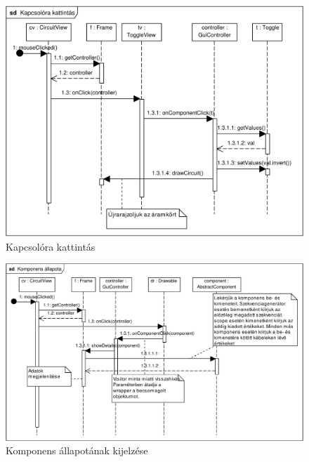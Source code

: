 \begin{figure}[h]
\begin{center}
\includegraphics[width=17cm]{chapters/chapter11/pdfs/9_toggle.pdf}
\caption{Kapcsolóra kattintás}
\label{fig:toggle}
\end{center}
\end{figure}

\begin{figure}[h]
\begin{center}
\includegraphics[width=17cm]{chapters/chapter11/pdfs/10_showcomponent.pdf}
\caption{Komponens állapotának kijelzése}
\label{fig:showcomponent}
\end{center}
\end{figure}

